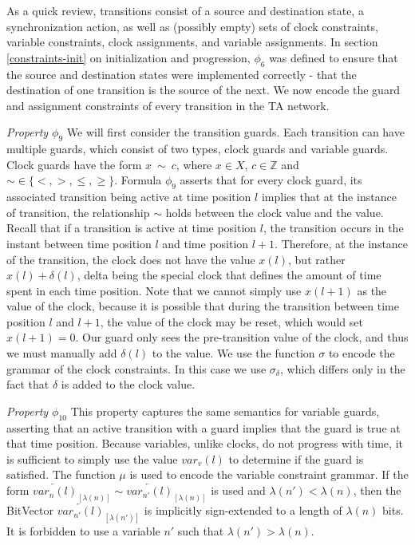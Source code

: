\documentclass[a4paper,12pt]{article}
\begin{document}
As a quick review, transitions consist of a source and destination state, a
synchronization action, as well as (possibly empty) sets of clock constraints,
variable constraints, clock assignments, and variable assignments. In section
\ref{constraints-init} on initialization and progression, \(\phi_6\) was defined
to ensure that the source and destination states were implemented correctly -
that the destination of one transition is the source of the next. We now
encode the guard and assignment constraints of every transition in the TA network.


\emph{Property $\phi_{9}$} We will first consider the transition guards. Each
transition can have multiple guards, which consist of two types, clock guards
and variable guards. Clock guards have the form \(x\ \sim\ c\), where
\(x \in X\), \(c \in \mathbb{Z}\) and \(\sim \in \{<,>,\leq,\geq\}\). Formula
\(\phi_9\) asserts that for every clock guard, its associated transition being
active at time position \(l\) implies that at the instance of transition, the
relationship \(\sim\) holds between the clock value and the value. Recall that
if a transition is active at time position \(l\), the transition occurs in the
instant between time position \(l\) and time position \(l+1\). Therefore, at the
instance of the transition, the clock does not have the value \(x(l)\), but
rather \(x(l) + \delta(l)\), delta being the special clock that defines the
amount of time spent in each time position. Note that we cannot simply use
\(x(l+1)\) as the value of the clock, because it is possible that during the
transition between time position \(l\) and \(l+1\), the value of the clock may
be reset, which would set \(x(l+1)=0\). Our guard only sees the pre-transition
value of the clock, and thus we must manually add \(\delta(l)\) to the value.
We use the function $\sigma$ to encode the grammar of the clock constraints. In
this case we use $\sigma_{\delta}$, which differs only in the fact that $\delta$
is added to the clock value.

\emph{Property $\phi_{10}$} This property captures the same semantics for
variable guards, asserting that an active transition with a guard implies that
the guard is true at that time position. Because variables, unlike clocks, do
not progress with time, it is sufficient to simply use the value \(var_{v}(l)\)
to determine if the guard is satisfied. The function $\mu$ is used to encode the
variable constraint grammar. If the form
$\overleftarrow{var_{n}(l)}_{[\lambda(n)]} \sim \overleftarrow{var_{n'}(l)}_{[\lambda(n)]}$
is used and $\lambda(n') < \lambda(n)$, then the BitVector
$\overleftarrow{var_{n'}(l)}_{[\lambda(n')]}$ is implicitly sign-extended to a
length of $\lambda(n)$ bits. It is forbidden to use a variable $n'$ such that
$\lambda(n') > \lambda(n)$.
\end{document}
